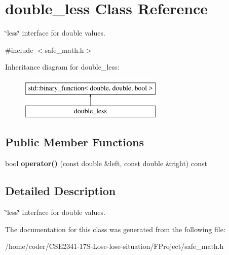 \section{double\+\_\+less Class Reference}
\label{classdouble__less}


\char`\"{}less\char`\"{} interface for double values.  




{\ttfamily \#include $<$safe\+\_\+math.\+h$>$}

Inheritance diagram for double\+\_\+less\+:\begin{figure}[H]
\begin{center}
\leavevmode
\includegraphics[height=2.000000cm]{classdouble__less}
\end{center}
\end{figure}
\subsection*{Public Member Functions}
\begin{DoxyCompactItemize}
\item 
bool {\bfseries operator()} (const double \&left, const double \&right) const 
\end{DoxyCompactItemize}


\subsection{Detailed Description}
\char`\"{}less\char`\"{} interface for double values. 

The documentation for this class was generated from the following file\+:\begin{DoxyCompactItemize}
\item 
/home/coder/\+C\+S\+E2341-\/17\+S-\/\+Lose-\/lose-\/situation/\+F\+Project/safe\+\_\+math.\+h\end{DoxyCompactItemize}
